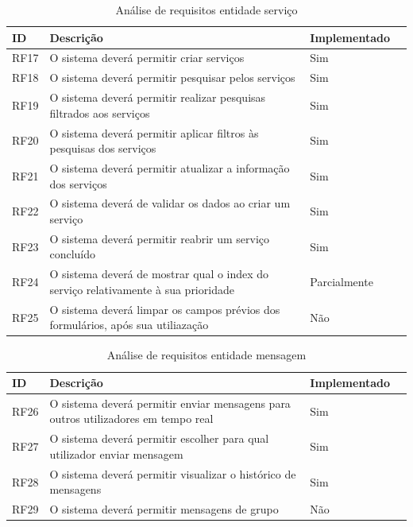 \documentclass[a4paper,12pt]{article} %
\begin{document}
\begin{table}[H]
	\centering
	\begin{tabular}{|l|p{12cm}|l|r|}
		\hline
		\textbf{ID} & \textbf{Descrição} & \textbf{Implementado}\\
		\hline
		RF17 & O sistema deverá permitir criar serviços & Sim \\
		\hline
		RF18 & O sistema deverá permitir pesquisar pelos serviços & Sim \\
		\hline
		RF19 & O sistema deverá permitir realizar pesquisas filtrados aos serviços & Sim \\
		\hline
		RF20 & O sistema deverá permitir aplicar filtros às pesquisas dos serviços & Sim \\
		\hline
		RF21 & O sistema deverá permitir atualizar a informação dos serviços & Sim \\
		\hline
		RF22 & O sistema deverá de validar os dados ao criar um serviço & Sim \\
		\hline
		RF23 & O sistema deverá permitir reabrir um serviço concluído & Sim \\
		\hline
		RF24 & O sistema deverá de mostrar qual o index do serviço relativamente à sua prioridade & Parcialmente\footnotemark \\
		\hline
		RF25 & O sistema deverá limpar os campos prévios dos formulários, após sua utiliazação & Não \\
		\hline
	\end{tabular}
	\caption{Análise de requisitos entidade serviço}
\end{table}

\begin{table}[H]
	\centering
	\begin{tabular}{|l|p{12cm}|l|r|}
		\hline
		\textbf{ID} & \textbf{Descrição} & \textbf{Implementado}\\
		\hline
		RF26 & O sistema deverá permitir enviar mensagens para outros utilizadores em tempo real & Sim \\
		\hline
		RF27 & O sistema deverá permitir escolher para qual utilizador enviar mensagem & Sim \\
		\hline
		RF28 & O sistema deverá permitir visualizar o histórico de mensagens & Sim \\
		\hline
		RF29 & O sistema deverá permitir mensagens de grupo & Não \\
		\hline
	\end{tabular}
	\caption{Análise de requisitos entidade mensagem}
\end{table}
\end{document}

